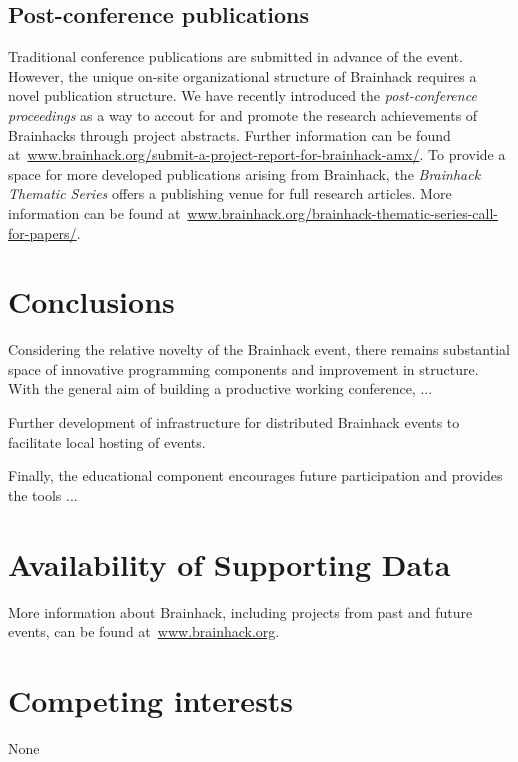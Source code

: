 \documentclass[11pt]{bmc_article_s50}
\begin{document}
\subsection{Post-conference publications}

Traditional conference publications are submitted in advance of the event. However, the unique on-site organizational structure of Brainhack requires a novel publication structure. We have recently introduced the \emph{post-conference proceedings} as a way to accout for and promote the research achievements of Brainhacks through project abstracts. Further information can be found at~\href{http://brainhack.org/submit-a-project-report-for-brainhack-amx/}{www.brainhack.org/submit-a-project-report-for-brainhack-amx/}. To provide a space for more developed publications arising from Brainhack, the \emph{Brainhack Thematic Series} offers a publishing venue for full research articles. More information can be found at~\href{http://brainhack.org/brainhack-thematic-series-call-for-papers/}{www.brainhack.org/brainhack-thematic-series-call-for-papers/}.

\section{Conclusions}

Considering the relative novelty of the Brainhack event, there remains substantial space of innovative programming components and improvement in structure. With the general aim of building a productive working conference, ...

Further development of infrastructure for distributed Brainhack events to facilitate local hosting of events. 

Finally, the educational component encourages future participation and provides the tools ...

\newpage
\section*{Availability of Supporting Data}
More information about Brainhack, including projects from past and future events, can be found at~\href{http://www.brainhack.org}{www.brainhack.org}.

\section*{Competing interests}
None
\end{document}
